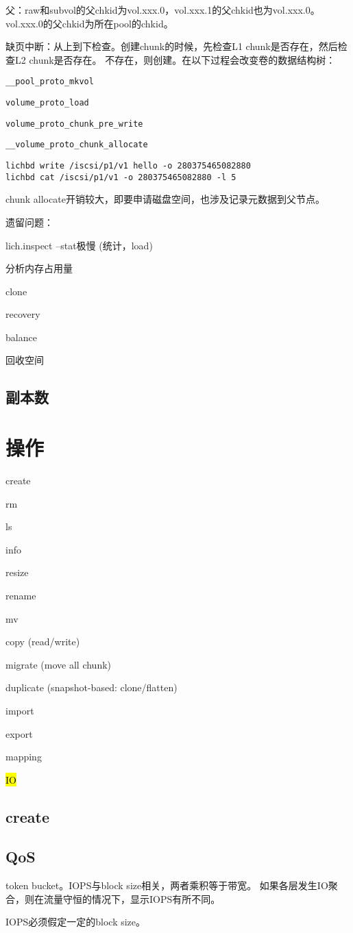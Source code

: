 父：raw和subvol的父chkid为vol.xxx.0，vol.xxx.1的父chkid也为vol.xxx.0。vol.xxx.0的父chkid为所在pool的chkid。

缺页中断：从上到下检查。创建chunk的时候，先检查L1 chunk是否存在，然后检查L2 chunk是否存在。
不存在，则创建。在以下过程会改变卷的数据结构树：
\begin{compactitem}
\item \verb|__pool_proto_mkvol|
\item \verb|volume_proto_load|
\item \verb|volume_proto_chunk_pre_write|
\item \verb|__volume_proto_chunk_allocate|
\end{compactitem}

\begin{lstlisting}[frame=single]
lichbd write /iscsi/p1/v1 hello -o 280375465082880
lichbd cat /iscsi/p1/v1 -o 280375465082880 -l 5
\end{lstlisting}

chunk allocate开销较大，即要申请磁盘空间，也涉及记录元数据到父节点。

遗留问题：
\begin{enumbox}
\item lich.inspect --stat极慢 (统计，load)
\item 分析内存占用量
\item clone
\item recovery
\item balance
\item 回收空间
\end{enumbox}

\subsection{副本数}

\section{操作}

\begin{enumbox}
\item create
\item rm
\item ls
\item info
\item resize
\item rename
\item mv
\item copy (read/write)
\item migrate (move all chunk)
\item duplicate (snapshot-based: clone/flatten)
\item import
\item export
\item mapping
\item \hl{IO}
\end{enumbox}

\subsection{create}

\subsection{QoS}

token bucket。IOPS与block size相关，两者乘积等于带宽。
如果各层发生IO聚合，则在流量守恒的情况下，显示IOPS有所不同。

IOPS必须假定一定的block size。
